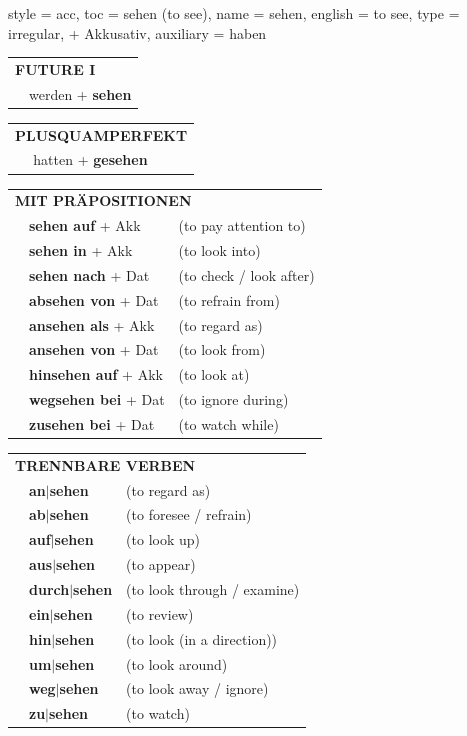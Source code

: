 \begin{verbentry}{
  style = {acc},
  toc = {sehen (to see)},
  name = {sehen},
  english = {to see},
  type = {irregular, + Akkusativ},
  auxiliary = {haben}
}
\begin{tabular}{rl}
    \multicolumn{2}{l}{\textbf{FUTURE I} }\\
  &  werden + \textbf{sehen}\\
 
  \end{tabular}
\hfill
   \begin{tabular}{rl}
      \multicolumn{2}{l}{\textbf{PLUSQUAMPERFEKT}}\\
  &  hatten + \textbf{gesehen}\\
  \end{tabular}
  


 \vspace{10pt}

   \begin{tabular}{lll}
      \multicolumn{3}{l}{\textbf{MIT PRÄPOSITIONEN}}\\
& \textbf{sehen auf} + Akk & (to pay attention to)\\
& \textbf{sehen in} + Akk & (to look into)\\
& \textbf{sehen nach} + Dat & (to check / look after)\\
& \textbf{absehen von} + Dat & (to refrain from)\\
& \textbf{ansehen als} + Akk & (to regard as)\\
& \textbf{ansehen von} + Dat & (to look from)\\
& \textbf{hinsehen auf} + Akk & (to look at)\\
& \textbf{wegsehen bei} + Dat & (to ignore during)\\
& \textbf{zusehen bei} + Dat & (to watch while)\\
  \end{tabular}
  \hfill
   \begin{tabular}{lll}
      \multicolumn{3}{l}{\textbf{TRENNBARE VERBEN}}\\
 & \textbf{an$|$sehen} & (to regard as)\\
  & \textbf{ab$|$sehen} & (to foresee / refrain)\\
   & \textbf{auf$|$sehen} & (to look up)\\
     & \textbf{aus$|$sehen} & (to appear)\\
    & \textbf{durch$|$sehen} & (to look through / examine)\\
      & \textbf{ein$|$sehen} & (to review)\\
    & \textbf{hin$|$sehen} & (to look (in a direction))\\
      & \textbf{um$|$sehen} & (to look around)\\
     & \textbf{weg$|$sehen} & (to look away / ignore)\\
      & \textbf{zu$|$sehen} & (to watch)\\
  \end{tabular}


  \vspace{-5pt}
\end{verbentry}


